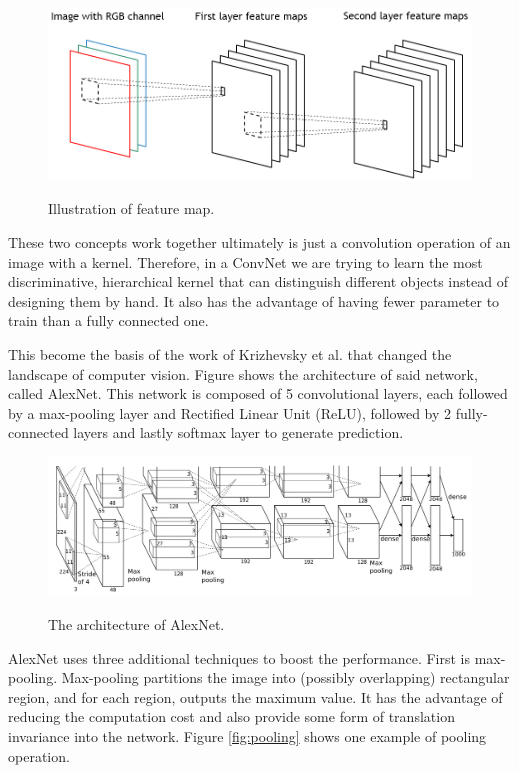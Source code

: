 \documentclass[a4paper,11pt]{kth-mag}
\begin{document}
\begin{figure}[h]
\centering
\includegraphics[scale=0.5]{image/feature_map.png}
\label{fig:feature_map}
\caption{Illustration of feature map.}
\end{figure}

These two concepts work together ultimately is just a convolution operation of an image with a kernel. Therefore, in a ConvNet we are trying to learn the most discriminative, hierarchical kernel that can distinguish different objects instead of designing them by hand. It also has the advantage of having fewer parameter to train than a fully connected one.

This become the basis of the work of Krizhevsky et al. that changed the landscape of computer vision. Figure \label{fig:alexnet} shows the architecture of said network, called AlexNet. This network is composed of 5 convolutional layers, each followed by a max-pooling layer and Rectified Linear Unit (ReLU), followed by 2 fully-connected layers and lastly softmax layer to generate prediction.

\begin{figure}[h]
\centering
\includegraphics[scale=0.35]{image/alexnet.png}
\label{fig:alexnet}
\caption{The architecture of AlexNet.}
\end{figure}

AlexNet uses three additional techniques to boost the performance. First is max-pooling. Max-pooling partitions the image into (possibly overlapping) rectangular region, and for each region, outputs the maximum value. It has the advantage of reducing the computation cost and also provide some form of translation invariance into the network. Figure \ref{fig:pooling} shows one example of pooling operation.
\end{document}
